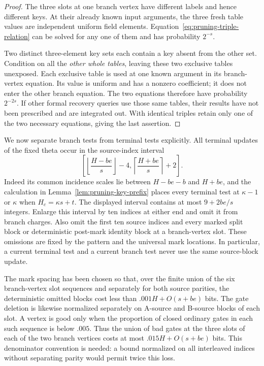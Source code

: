 \begin{proof}
The three slots at one branch vertex have different labels and hence
different keys.  At their already known input arguments, the
three fresh table values are independent uniform field
elements.  Equation~\eqref{eq:pruning-triple-relation} can be
solved for any one of them and has probability $2^{-s}$.

Two distinct three-element key sets each contain a key absent
from the other set.  Condition on all the \emph{other whole
tables}, leaving these two exclusive tables unexposed.  Each
exclusive table is used at one known argument in its branch-vertex
equation.  Its value is uniform and has a nonzero coefficient;
it does not enter the other branch equation.  The two equations
therefore have probability $2^{-2s}$.  If other formal recovery
queries use those same tables, their results have not been
prescribed and are integrated out.  With identical triples
retain only one of the two necessary equations, giving the
last assertion.
\end{proof}

We now separate branch tests from terminal tests explicitly.
All terminal updates of the fixed theta occur in the source-index
interval
\[
 \left[\left\lfloor\frac{H-be}{s}\right\rfloor-4,
       \left\lceil\frac{H+be}{s}\right\rceil+2\right].
\]
Indeed its common incidence scales lie between $H-be-b$ and
$H+be$, and the calculation in
Lemma~\ref{lem:pruning-key-prefix} places every terminal test
at $\kappa-1$ or $\kappa$ when $H_c=\kappa s+t$.
The displayed interval contains at most $9+2be/s$ integers.
Enlarge this interval by ten
indices at either end and omit it from branch charges.  Also
omit the first ten source indices and every marked split block
or deterministic post-mark identity block at a branch-vertex slot.
These omissions are fixed by the pattern and the universal
mark locations.  In particular, a current terminal test and a
current branch test never use the same source-block update.

The mark spacing has been chosen so that, over the finite union
of the six branch-vertex slot sequences and separately for both source
parities, the deterministic omitted blocks cost less than
$.001H+O(s+be)$ bits.  The gate deletion is likewise normalized
separately on A-source and B-source blocks of each slot.  A
vertex is good only when the proportion of closed ordinary
gates in each such sequence is below $.005$.  Thus the union
of bad gates at the three slots of each of the two branch vertices
costs at most $.015H+O(s+be)$ bits.  This denominator convention
is needed: a bound normalized on all interleaved indices
without separating parity would permit twice this loss.

